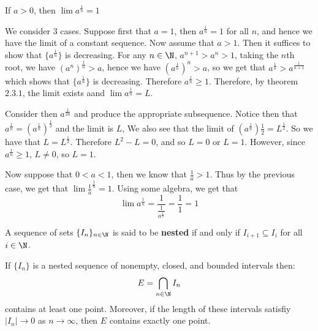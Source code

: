 \begin{example}
    If $a>0$, then  $\lim{a^{\frac{1}{n}}}=1$		
\end{example} 
\begin{solution}
    We consider $3$ cases. Suppose first that  $a=1$, then  $a^\frac{1}{n}=1$ 
    for all $n$, and hence we have the limit of a constant sequence. Now assume 
    that  $a>1$. Then it suffices to show that  $\{a^{\frac{1}{n}}\}$ is 
    decreasing. For any $n \in \N$,  $a^{n+1}>a^n>1$, taking the  $n$th root, 
    we have  $(a^n)^{\frac{1}{n}}>a$, hence we have $(a^{\frac{1}{n}})^n>a$, 
    so we get that $a^{\frac{1}{n}}>a^{\frac{1}{n+1}}$ which shows that 
    $\{a^{\frac{1}{n}}\}$ is decreasing. Therefore $a^{\frac{1}{n}}  \geq 1$. 
    Therefore, by theorem $2.3.1$, the limit exists aand  $\lim{a^\frac{1}{n}}=L$.

    Consider then $a^\frac{1}{2n}$ and produce the appropriate subsequence. Notice 
    then that $a^{\frac{1}{n}}=(a^\frac{1}{n})^\frac{1}{2}$ and the limit is $L$, 
    We also see that the limit of  $(a^\frac{1}{n})\frac{1}{2}=L^\frac{1}{2}$. 
    So we have that $L=L^\frac{1}{2}$. Therefore $L^2-L=0$, and so $L=0$ or  
    $L=1$. However, since  $a^\frac{1}{n} \geq 1$, $L \neq 0$, so  $L=1$.

    Now suppose that $0<a<1$, then we know that  $ \frac{1}{a}>1$. Thus by the 
    previous case, we get that $\lim{\frac{1}{a}^\frac{1}{n}}=1$. Using some 
    algebra, we get that
        \begin{equation*}
            \lim{a^\frac{1}{n}}=\frac{1}{\frac{1}{a^\frac{1}{n}}}=\frac{1}{1}=1
        \end{equation*} 
\end{solution}

\begin{definition}
    A sequence of sets $\{I_n\}_{n \in \N}$ is said to be \textbf{nested} if and 
    only if $I_{i+1} \subseteq I_i$ for all $i \in \N$.
\end{definition}

\begin{theorem}\label{2.3.2}
    If $\{I_n\}$ is a nested sequence of nonempty, closed, and bounded intervals 
    then:
        \begin{equation*}
            E=\bigcap_{n \in \N} I_n
        \end{equation*}
    contains at least one point. Moreover, if the length of these intervals 
    satisfiy  $|I_n| \rightarrow 0$ as  $n \rightarrow \infty$, then  $E$ contains 
    exactly one point.
\end{theorem}

